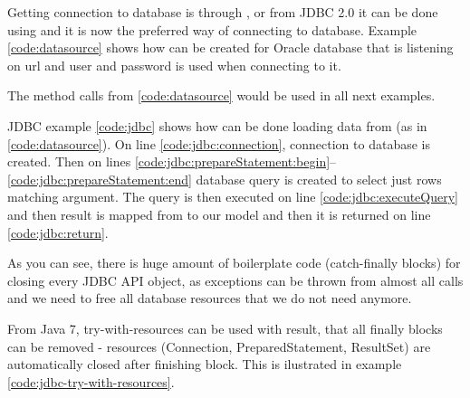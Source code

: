 Getting connection to database is through , or from JDBC 2.0
it can be done using  and it is now the preferred way of connecting to database.
Example \ref{code:datasource} shows how  can be created for Oracle database
that is listening on url 
and  user and  password is used when connecting to it.

The  method calls from \ref{code:datasource} would be used in all next examples.


JDBC example \ref{code:jdbc} shows how can be done loading data from  (as in \ref{code:datasource}).
On line \ref{code:jdbc:connection}, connection to database is created.
Then on lines \ref{code:jdbc:prepareStatement:begin}--\ref{code:jdbc:prepareStatement:end}
database query is created to select just rows matching  argument.
The query is then executed on line \ref{code:jdbc:executeQuery} and then
result is mapped from  to our  model and then it is returned on line \ref{code:jdbc:return}.

As you can see, there is huge amount of boilerplate code (catch-finally blocks) for closing every JDBC API object,
as exceptions can be thrown from almost all calls and we need to free all database resources that we do not need anymore.

From Java 7, try-with-resources can be used with result, that all finally blocks can be removed - resources
(Connection, PreparedStatement, ResultSet) are automatically closed after finishing block.
This is ilustrated in example \ref{code:jdbc-try-with-resources}.





